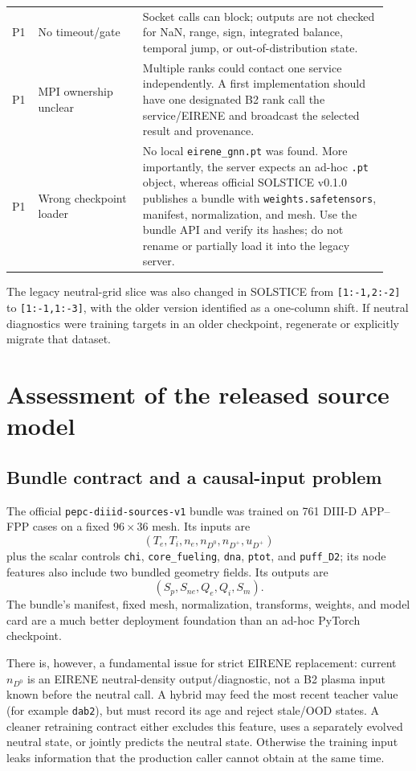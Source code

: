 \documentclass[11pt]{article}
\begin{document}
\begin{longtable}{@{}p{0.06\linewidth}p{0.26\linewidth}p{0.61\linewidth}@{}}
P1 & No timeout/gate & Socket calls can block; outputs are not checked for NaN, range, sign, integrated balance, temporal jump, or out-of-distribution state. \\
P1 & MPI ownership unclear & Multiple ranks could contact one service independently. A first implementation should have one designated B2 rank call the service/EIRENE and broadcast the selected result and provenance. \\
P1 & Wrong checkpoint loader & No local \texttt{eirene\_gnn.pt} was found. More importantly, the server expects an ad-hoc \texttt{.pt} object, whereas official SOLSTICE v0.1.0 publishes a bundle with \texttt{weights.safetensors}, manifest, normalization, and mesh. Use the bundle API and verify its hashes; do not rename or partially load it into the legacy server. \\
\bottomrule
\end{longtable}

The legacy neutral-grid slice was also changed in SOLSTICE from \texttt{[1:-1,2:-2]} to \texttt{[1:-1,1:-3]}, with the older version identified as a one-column shift. If neutral diagnostics were training targets in an older checkpoint, regenerate or explicitly migrate that dataset.

\section{Assessment of the released source model}

\subsection{Bundle contract and a causal-input problem}

The official \texttt{pepc-diiid-sources-v1} bundle was trained on 761 DIII-D APP--FPP cases on a fixed $96\times36$ mesh. Its inputs are
\[
(T_e,T_i,n_e,n_{D^0},n_{D^+},u_{D^+})
\]
plus the scalar controls \texttt{chi}, \texttt{core\_fueling}, \texttt{dna}, \texttt{ptot}, and \texttt{puff\_D2}; its node features also include two bundled geometry fields. Its outputs are
\[
(S_p,S_{ne},Q_e,Q_i,S_m).
\]
The bundle's manifest, fixed mesh, normalization, transforms, weights, and model card are a much better deployment foundation than an ad-hoc PyTorch checkpoint.

There is, however, a fundamental issue for strict EIRENE replacement: current \(n_{D^0}\) is an EIRENE neutral-density output/diagnostic, not a B2 plasma input known before the neutral call. A hybrid may feed the most recent teacher value (for example \texttt{dab2}), but must record its age and reject stale/OOD states. A cleaner retraining contract either excludes this feature, uses a separately evolved neutral state, or jointly predicts the neutral state. Otherwise the training input leaks information that the production caller cannot obtain at the same time.
\end{document}
